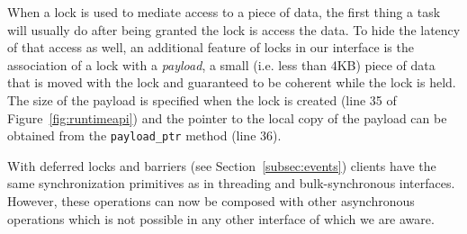 When a lock is used to mediate access to a piece of data, the first thing a task will usually
do after being granted the lock is access the data.  To hide the latency of that
access as well, an additional feature of locks in our interface is the association of a lock with a
{\em payload}, a small (i.e. less than 4KB) 
piece of data that is moved with the lock and guaranteed to be coherent while 
the lock is held.  The size of the payload is specified when the lock is created (line 35 of Figure~\ref{fig:runtimeapi}) and
the pointer to the local copy of the payload can be obtained from the {\tt payload\_ptr} method
(line 36).

With deferred locks and barriers (see Section~\ref{subsec:events}) clients 
have the same synchronization primitives as
in threading and bulk-synchronous interfaces.  However, these operations can now 
be composed with other asynchronous operations which is not possible in any other interface
of which we are aware.



